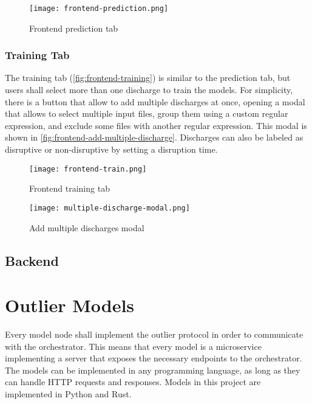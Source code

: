 \begin{figure}[H]
    \centering
    \texttt{[image: frontend-prediction.png]}
    \caption{Frontend prediction tab}
    \label{fig:frontend-prediction}
\end{figure}

\subsubsection{Training Tab}

The training tab (\autoref{fig:frontend-training}) is similar to the prediction tab, but users shall select more than one discharge to train the models. For simplicity, there is a button that allow to add multiple discharges at once, opening a modal that allows to select multiple input files, group them using a custom regular expression, and exclude some files with another regular expression. This modal is shown in \autoref{fig:frontend-add-multiple-discharge}. Discharges can also be labeled as disruptive or non-disruptive by setting a disruption time.

\begin{figure}[H]
    \centering
    \texttt{[image: frontend-train.png]}
    \caption{Frontend training tab}
    \label{fig:frontend-training}
\end{figure}

\begin{figure}[H]
    \centering
    \texttt{[image: multiple-discharge-modal.png]}
    \caption{Add multiple discharges modal}
    \label{fig:frontend-add-multiple-discharge}
\end{figure}

\subsection{Backend}


\section{Outlier Models}

Every model node shall implement the outlier protocol in order to communicate with the orchestrator. This means that every model is a microservice implementing a server that exposes the necessary endpoints to the orchestrator. The models can be implemented in any programming language, as long as they can handle HTTP requests and responses. Models in this project are implemented in Python and Rust.

